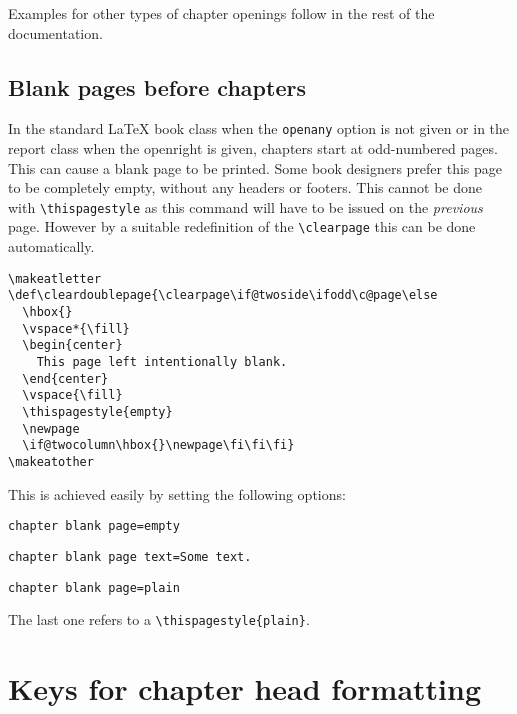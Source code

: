 \addtocounter{chapter}{-1}

Examples for other types of chapter openings follow in the rest of the documentation.

\subsection{Blank pages before chapters}

In the standard LaTeX book class when the \texttt{openany} option is not given or in the report class when the openright is given, chapters start at odd-numbered pages. This can cause a blank page to be printed. Some book designers prefer this page to be completely empty, without any headers or footers. This cannot be done with \lstinline{\thispagestyle} as this command will have to be issued on the \textit{previous} page. However by a suitable redefinition of the
\lstinline{\clearpage} this can be done automatically.
\medskip

\begin{tcolorbox}
\begin{lstlisting}
\makeatletter
\def\cleardoublepage{\clearpage\if@twoside\ifodd\c@page\else
  \hbox{}
  \vspace*{\fill}
  \begin{center}
    This page left intentionally blank.
  \end{center}
  \vspace{\fill}
  \thispagestyle{empty}
  \newpage
  \if@twocolumn\hbox{}\newpage\fi\fi\fi}
\makeatother
\end{lstlisting}
\end{tcolorbox}
\medskip

This is achieved easily by setting the following options:
\bigskip

\begin{tcolorbox}
\lstinline{chapter blank page=empty}\par
\lstinline{chapter blank page text=Some text.}\par
\lstinline{chapter blank page=plain}\par
\end{tcolorbox}
\medskip



The last one refers to a \lstinline!\thispagestyle{plain}!.



\section{Keys for chapter head formatting}

